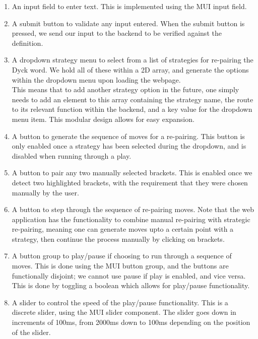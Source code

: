 \begin{enumerate}
    \item An input field to enter text. This is implemented using the MUI input field. 
    \item A submit button to validate any input entered. When the submit button is pressed, we send our input to the backend to be verified against the definition.
    \item A dropdown strategy menu to select from a list of strategies for re-pairing the Dyck word. We hold all of these within a 2D array, and generate the options within the dropdown menu upon loading the webpage. 
    \\ This means that to add another strategy option in the future, one simply needs to add an element to this array containing the strategy name, the route to its relevant function within the backend, and a key value for the dropdown menu item. This modular design allows for easy expansion.
    \item A button to generate the sequence of moves for a re-pairing. This button is only enabled once a strategy has been selected during the dropdown, and is disabled when running through a play.
    \item A button to pair any two manually selected brackets. This is enabled once we detect two highlighted brackets, with the requirement that they were chosen manually by the user. 
    \item A button to step through the sequence of re-pairing moves. Note that the web application has the functionality to combine manual re-pairing with strategic re-pairing, meaning one can generate moves upto a certain point with a strategy, then continue the process manually by clicking on brackets.
    \item A button group to play/pause if choosing to run through a sequence of moves. This is done using the MUI button group, and the buttons are functionally disjoint; we cannot use pause if play is enabled, and vice versa. This is done by toggling a boolean which allows for play/pause functionality.
    \item A slider to control the speed of the play/pause functionality. This is a discrete slider, using the MUI slider component. The slider goes down in increments of 100ms, from 2000ms down to 100ms depending on the position of the slider.
\end{enumerate}

